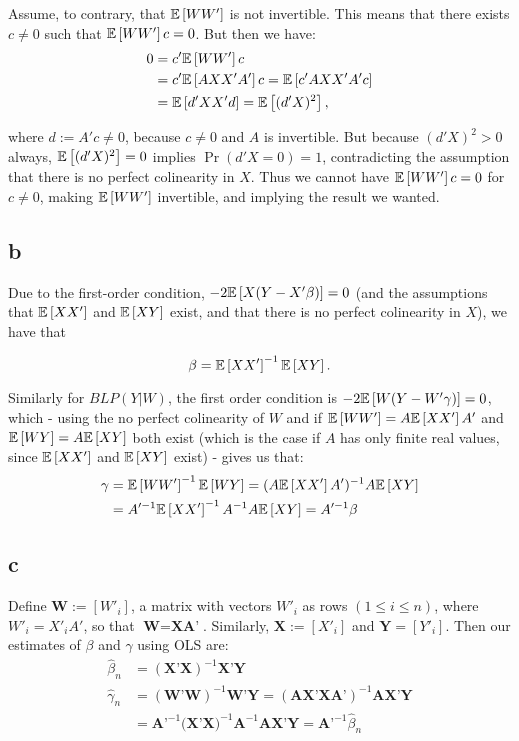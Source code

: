 \documentclass[12pt]{paper}
\begin{document}
Assume, to contrary, that $\mathbb{E} \left [ WW' \right ]$ is not invertible. This means that there exists $c\ne0$ such that $\mathbb{E} \left [ WW' \right ]c=0$. But then we have:
\begin{equation}
\begin{split}
0&=c'\mathbb{E} \left [ WW' \right ]c\\
&=c'\mathbb{E} \left [ AXX'A' \right ]c=\mathbb{E} \left [ c'AXX'A'c \right ]\\
&=\mathbb{E} \left [ d'XX'd \right ]=\mathbb{E} \left [ (d'X)^2 \right ],
\end{split}
\end{equation}

\noindent where $d:=A'c\ne0$, because $c\ne0$ and $A$ is invertible. But because $(d'X)^2>0$ always, $\mathbb{E} \left [ (d'X)^2 \right ]=0$ implies $\Pr(d'X=0)=1$, contradicting the assumption that there is no perfect colinearity in $X$. Thus we cannot have $\mathbb{E} \left [ WW' \right ]c=0$ for $c\ne0$, making $\mathbb{E} \left [ WW' \right ]$ invertible, and implying the result we wanted.

\subsection*{b}

Due to the first-order condition, $-2\mathbb{E} \left [ X(Y-X'\beta) \right ]=0$ (and the assumptions that $\mathbb{E} \left [ XX' \right ]$ and $\mathbb{E} \left [ XY \right ]$ exist, and that there is no perfect colinearity in $X$), we have that 

\begin{equation}
\beta=\mathbb{E} \left [ XX' \right ]^{-1}\mathbb{E} \left [ XY \right ].
\end{equation}

Similarly for $BLP(Y|W)$, the first order condition is $-2\mathbb{E} \left [ W(Y-W'\gamma) \right ]=0$, which - using the no perfect colinearity of $W$ and if $\mathbb{E} \left [ WW' \right ]=A\mathbb{E} \left [ XX' \right ]A'$ and $\mathbb{E} \left [ WY \right ]=A\mathbb{E} \left [ XY \right ]$ both exist (which is the case if $A$ has only finite real values, since $\mathbb{E} \left [ XX' \right ]$ and $\mathbb{E} \left [ XY \right ]$ exist) -  gives us that:
\begin{equation}
\begin{split}
\gamma&=\mathbb{E} \left [ WW' \right ]^{-1}\mathbb{E} \left [ WY \right ]=(A\mathbb{E} \left [ XX' \right ]A')^{-1}A\mathbb{E} \left [ XY \right ]\\
&=A'^{-1}\mathbb{E} \left [ XX' \right ]^{-1}A^{-1}A\mathbb{E} \left [ XY \right ]=A'^{-1}\beta
\end{split}
\end{equation}

\subsection*{c}

Define $\textbf{W}:=[W'_i]$, a matrix with vectors $W'_i$ as rows $(1\le i \le n)$, where $W'_i=X'_iA'$, so that $\textbf{W}=\textbf{XA'}$. Similarly, $\textbf{X}:=[X'_i]$ and $\textbf{Y}=[Y'_i]$. Then our estimates of $\beta$ and $\gamma$ using OLS are:
\begin{equation}
\begin{split}
\hat{\beta}_n&=(\textbf{X'X})^{-1}\textbf{X'Y}\\
\hat{\gamma}_n&=(\textbf{W'W})^{-1}\textbf{W'Y}=(\textbf{AX'XA'})^{-1}\textbf{AX'Y}\\
&=\textbf{A'}^{-1}\textbf{(X'X)}^{-1}\textbf{A}^{-1}\textbf{AX'Y}=\textbf{A'}^{-1}\hat{\beta}_n
\end{split}
\end{equation}
\end{document}
